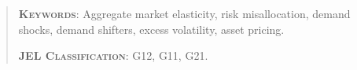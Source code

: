 \documentclass[12pt,english]{article}
\begin{document}
\begin{abstract}
  
  
  \vspace{10mm} 
  \bigskip
  
  \noindent 
  \textsc{\textbf{Keywords}}: Aggregate market elasticity, risk misallocation, demand shocks, demand shifters, excess volatility, asset pricing. 
  
  \medskip
  \noindent
  \textsc{\textbf{JEL Classification}}: G12, G11, G21.   
\end{abstract}
	
\newpage
\doublespacing
\setcounter{page}{1}
	

\newpage
\end{document}
